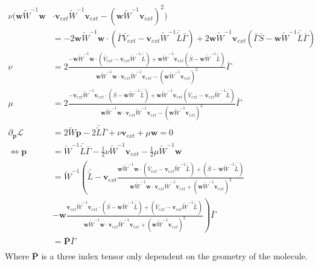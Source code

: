 \begin{align}
    \nu(\mathbf{w}\tilde W^{-1}\mathbf{w} & \cdot\mathbf{v}_{ext}\tilde W^{-1}\mathbf{v}_{ext}-(\mathbf{w}\tilde W^{-1}\mathbf{v}_{ext})^2 )\\
    &= -2\mathbf{w}\tilde W^{-1}\mathbf{w}\cdot\left(\bar\Gamma \bar{V}_{ext} - \mathbf{v}_{ext}\tilde W^{-1}\bar {\tilde L} \bar\Gamma\right)+2\mathbf{w}\tilde W^{-1}\mathbf{v}_{ext}\left(\bar\Gamma\bar S - \mathbf{w}\tilde W^{-1}\bar {\tilde L} \bar\Gamma\right)\\
    \nu&= 2\frac{-\mathbf{w}\tilde W^{-1}\mathbf{w}\cdot\left(\bar{V}_{ext} - \mathbf{v}_{ext}\tilde W^{-1}\bar {\tilde L}\right)+\mathbf{w}\tilde W^{-1}\mathbf{v}_{ext}\left(\bar S - \mathbf{w}\tilde W^{-1}\bar {\tilde L}\right)}{\mathbf{w}\tilde W^{-1}\mathbf{w}\cdot\mathbf{v}_{ext}\tilde W^{-1}\mathbf{v}_{ext}-(\mathbf{w}\tilde W^{-1}\mathbf{v}_{ext})^2}\bar\Gamma\\
    \mu&= 2\frac{-\mathbf{v}_{ext}\tilde W^{-1}\mathbf{v}_{ext}\cdot\left(\bar S - \mathbf{w}\tilde W^{-1}\bar {\tilde L} \right)+\mathbf{w}\tilde W^{-1}\mathbf{v}_{ext}\left( \bar{V}_{ext}- \mathbf{v}_{ext}\tilde W^{-1}\bar {\tilde L} \right)}{\mathbf{w}\tilde W^{-1}\mathbf{w}\cdot\mathbf{v}_{ext}\tilde W^{-1}\mathbf{v}_{ext}-(\mathbf{w}\tilde W^{-1}\mathbf{v}_{ext})^2}\bar\Gamma\\
    \partial_{\mathbf p}\mathcal L&= 2\tilde{W} \mathbf{p}- 2 \bar {\tilde L} \bar\Gamma + \nu\mathbf{v}_{ext}+\mu \mathbf{w}= 0\\
    \Leftrightarrow\mathbf{p} &= \tilde W^{-1}\bar {\tilde L} \bar\Gamma - \frac{1}{2}\nu\tilde W^{-1}\mathbf{v}_{ext}-\frac{1}{2}\mu \tilde W^{-1}\mathbf{w}\\
    &= \tilde W^{-1}\left(\bar {\tilde L} - \mathbf{v}_{ext}\frac{\mathbf{w}\tilde W^{-1}\mathbf{w}\cdot\left(\bar{V}_{ext} - \mathbf{v}_{ext}\tilde W^{-1}\bar {\tilde L}\right)+\left(\bar S - \mathbf{w}\tilde W^{-1}\bar {\tilde L}\right)}{\mathbf{w}\tilde W^{-1}\mathbf{w}\cdot\mathbf{v}_{ext}\tilde W^{-1}\mathbf{v}_{ext}+(\mathbf{w}\tilde W^{-1}\mathbf{v}_{ext})^2}\right. \\
    &\left. -\mathbf{w}\frac{\mathbf{v}_{ext}\tilde W^{-1}\mathbf{v}_{ext}\cdot\left(\bar S - \mathbf{w}\tilde W^{-1}\bar {\tilde L} \right)+\left( \bar{V}_{ext}- \mathbf{v}_{ext}\tilde W^{-1}\bar {\tilde L} \right)}{\mathbf{w}\tilde W^{-1}\mathbf{w}\cdot\mathbf{v}_{ext}\tilde W^{-1}\mathbf{v}_{ext}+(\mathbf{w}\tilde W^{-1}\mathbf{v}_{ext})^2}\right)\bar\Gamma\\
    &= \bar{\mathbf{P}}\bar\Gamma\\
    \end{align}
Where $\bar{\mathbf{P}}$ is a three index tensor only dependent on the geometry of the molecule.

